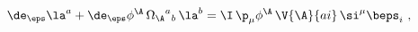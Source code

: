 \begin{equation} \label{la_trans}
  \de_\eps \la^a + \de_\eps \phi^\A\, {\Omega_\A}^a{}_b\, \la^b =
  \I\, \p_\mu \phi^\A\, \V{\A}{ai}\, \si^\mu \beps_i\ ,
 \end{equation}

